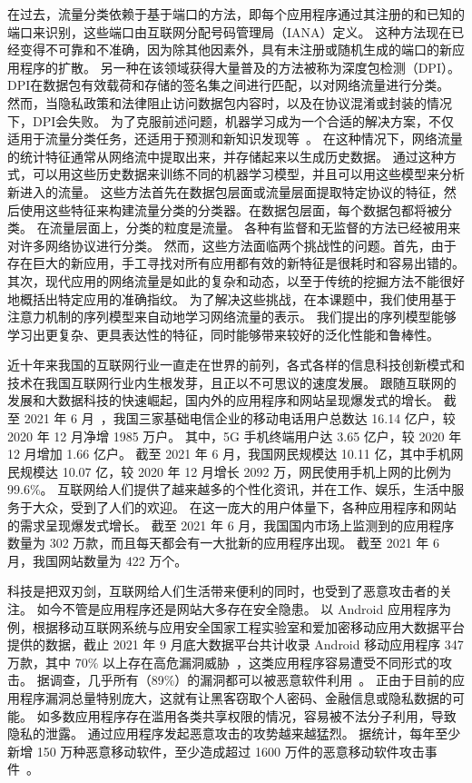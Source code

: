 \documentclass[degree=master,cjk-font=noto]{thuthesis}
\begin{document}
在过去，流量分类依赖于基于端口的方法，即每个应用程序通过其注册的和已知的端口来识别，这些端口由互联网分配号码管理局（IANA）定义。
这种方法现在已经变得不可靠和不准确，因为除其他因素外，具有未注册或随机生成的端口的新应用程序的扩散。
另一种在该领域获得大量普及的方法被称为深度包检测（DPI）。
DPI在数据包有效载荷和存储的签名集之间进行匹配，以对网络流量进行分类。
然而，当隐私政策和法律阻止访问数据包内容时，以及在协议混淆或封装的情况下，DPI会失败。
为了克服前述问题，机器学习成为一个合适的解决方案，不仅适用于流量分类任务，还适用于预测和新知识发现等~\cite{net2,net3,app_class,SDN_HGW,DMTCS,bitcoding}。
在这种情况下，网络流量的统计特征通常从网络流中提取出来，并存储起来以生成历史数据。
通过这种方式，可以用这些历史数据来训练不同的机器学习模型，并且可以用这些模型来分析新进入的流量。
这些方法首先在数据包层面或流量层面提取特定协议的特征，然后使用这些特征来构建流量分类的分类器。在数据包层面，每个数据包都将被分类。
在流量层面上，分类的粒度是流量。
各种有监督和无监督的方法已经被用来对许多网络协议进行分类。
然而，这些方法面临两个挑战性的问题。首先，由于存在巨大的新应用，手工寻找对所有应用都有效的新特征是很耗时和容易出错的。
其次，现代应用的网络流量是如此的复杂和动态，以至于传统的挖掘方法不能很好地概括出特定应用的准确指纹。
为了解决这些挑战，在本课题中，我们使用基于注意力机制的序列模型来自动地学习网络流量的表示。
我们提出的序列模型能够学习出更复杂、更具表达性的特征，同时能够带来较好的泛化性能和鲁棒性。

近十年来我国的互联网行业一直走在世界的前列，各式各样的信息科技创新模式和技术在我国互联网行业内生根发芽，且正以不可思议的速度发展。
跟随互联网的发展和大数据科技的快速崛起，国内外的应用程序和网站呈现爆发式的增长。
截至 2021 年 6 月~\cite{CNNIC-report}，我国三家基础电信企业的移动电话用户总数达 16.14 亿户，较 2020 年 12 月净增 1985 万户。
其中，5G 手机终端用户达 3.65 亿户，较 2020 年 12 月增加 1.66 亿户。
截至 2021 年 6 月，我国网民规模达 10.11 亿，其中手机网民规模达 10.07 亿，较 2020 年 12 月增长 2092 万，网民使用手机上网的比例为 99.6\%。
互联网给人们提供了越来越多的个性化资讯，并在工作、娱乐，生活中服务于大众，受到了人们的欢迎。
在这一庞大的用户体量下，各种应用程序和网站的需求呈现爆发式增长。
截至 2021 年 6 月，我国国内市场上监测到的应用程序数量为 302 万款，而且每天都会有一大批新的应用程序出现。
截至 2021 年 6 月，我国网站数量为 422 万个。

科技是把双刃剑，互联网给人们生活带来便利的同时，也受到了恶意攻击者的关注。
如今不管是应用程序还是网站大多存在安全隐患。
以 Android 应用程序为例，根据移动互联网系统与应用安全国家工程实验室和爱加密移动应用大数据平台提供的数据，截止 2021 年 9 月底大数据平台共计收录 Android 移动应用程序 347 万款，其中 70\% 以上存在高危漏洞威胁~\cite{App-report}，这类应用程序容易遭受不同形式的攻击。
据调查，几乎所有（89\%）的漏洞都可以被恶意软件利用~\cite{ZOL-report}。
正由于目前的应用程序漏洞总量特别庞大，这就有让黑客窃取个人密码、金融信息或隐私数据的可能。
如多数应用程序存在滥用各类共享权限的情况，容易被不法分子利用，导致隐私的泄露。
通过应用程序发起恶意攻击的攻势越来越猛烈。
据统计，每年至少新增 150 万种恶意移动软件，至少造成超过 1600 万件的恶意移动软件攻击事件~\cite{Attack-report}。
\end{document}
